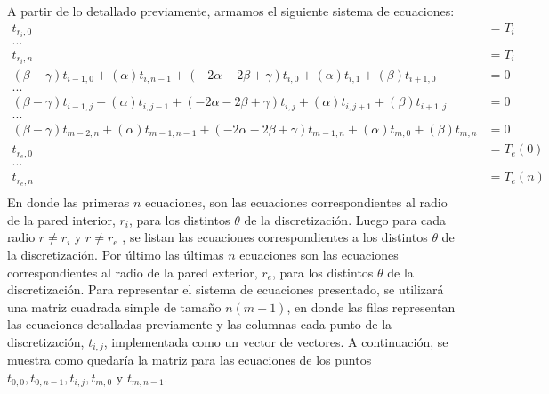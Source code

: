 A partir de lo detallado previamente, armamos el siguiente sistema de ecuaciones:
    \begin{equation*}
        \begin{aligned}
          t_{r_{i},0} &= T_{i} \\
          ...& \\
          t_{r_{i},n} &= T_{i} \\
          (\beta - \gamma)t_{i-1,0} + (\alpha)t_{i,n-1} + (-2\alpha-2\beta+\gamma)t_{i,0} + (\alpha)t_{i,1} + (\beta)t_{i+1,0} &= 0\\
          ...& \\
          (\beta - \gamma)t_{i-1,j} + (\alpha)t_{i,j-1} + (-2\alpha-2\beta+\gamma)t_{i,j} + (\alpha)t_{i,j+1} + (\beta)t_{i+1,j} &= 0\\
          ...& \\
          (\beta - \gamma)t_{m-2,n} + (\alpha)t_{m-1,n-1} + (-2\alpha-2\beta+\gamma)t_{m-1,n} + (\alpha)t_{m,0} + (\beta)t_{m,n} &= 0\\
          t_{r_{e},0} &= T_{e}(0) \\
          ...& \\
          t_{r_{e},n} &= T_{e}(n) \\
        \end{aligned}
    \end{equation*}
En donde las primeras $n$ ecuaciones, son las ecuaciones correspondientes al radio de la pared interior, $r_{i}$, para los distintos $\theta$ de la discretización. Luego para cada radio $r \neq r_{i}$ y $r \neq r_{e}$ , se listan las ecuaciones correspondientes a los distintos $\theta$ de la discretización. Por último las últimas $n$ ecuaciones son las ecuaciones correspondientes al radio de la pared exterior, $r_{e}$, para los distintos $\theta$ de la discretización.
\newline
\newline
Para representar el sistema de ecuaciones presentado, se utilizará una matriz cuadrada simple de tamaño $n(m+1)$, en donde las filas representan las ecuaciones detalladas previamente y las columnas cada punto de la discretización, $t_{i,j}$, implementada como un vector de vectores. A continuación, se muestra como quedaría la matriz para las ecuaciones de los puntos $t_{0,0}, t_{0,n-1}, t_{i,j}, t_{m,0}$ y $t_{m,n-1}$.

